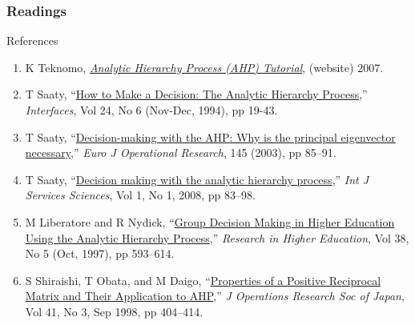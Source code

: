 \documentclass[10pt,handout,hyperref={colorlinks=true,linkcolor=blue,citecolor=citelink,urlcolor=gray}]{beamer}
\newcounter{e_temp}
\begin{document}
\begin{frame}[label=Readings]
\frametitle{Readings}
{\small
\vspace{-1.5ex}
\begin{block}{References}
\begin{enumerate}
\setlength{\itemsep}{1.75ex}
\item K Teknomo, \href{http://http://mathsci2.appstate.edu/~wmcb/Class/5340/ClassNotes141/AHP/AHP Tutorial Teknomo.pdf}{\it Analytic Hierarchy Process (AHP) Tutorial}, (website) 2007.

\item T Saaty, ``\href{http://mathsci2.appstate.edu/~wmcb/Class/5340/ClassNotes141/AHP/The\%20Analytic\%20Hierarchy\%20Process\%20Saaty\%201994.pdf}{How to Make a Decision: The Analytic Hierarchy Process},'' {\it Interfaces}, Vol 24, No 6 (Nov-Dec, 1994), pp 19-43.

\item T Saaty, ``\href{http://mathsci2.appstate.edu/~wmcb/Class/5340/ClassNotes141/AHP/Decision-making\%20with\%20the\%20AHP\%20Saaty\%202002.pdf}{Decision-making with the AHP: Why is the principal eigenvector necessary},''  {\it Euro J Operational Research}, 145 (2003), pp 85--91.

\item T Saaty, ``\href{http://mathsci2.appstate.edu/~wmcb/Class/5340/ClassNotes141/AHP/Analytic\%20Hierarchy\%20Proc\%20Saaty\%202008.pdf}{Decision making with the analytic hierarchy process},'' {\it Int J Services Sciences}, Vol 1, No 1, 2008, pp 83--98.

\item M Liberatore and R Nydick, ``\href{http://mathsci2.appstate.edu/~wmcb/Class/5340/ClassNotes141/AHP/Higher\%20Ed\%20AHP\%20Libertore\%20Nydick.pdf}{Group Decision Making in Higher Education Using the Analytic Hierarchy Process},'' {\it Research in Higher Education}, Vol 38, No 5 (Oct, 1997), pp 593--614.

\item S Shiraishi, T Obata, and M Daigo, ``\href{http://mathsci2.appstate.edu/~wmcb/Class/5340/ClassNotes141/AHP/Positive\%20Reciprocal\%20Matrix\%20Shiraishi\%2097.pdf}{Properties of a Positive Reciprocal Matrix and Their Application to AHP},'' {\it J Operations Research Soc of Japan}, Vol 41, No 3, Sep 1998, pp 404--414.
\end{enumerate}
\end{block}
\vfill
\centerline{\href{http://mathsci2.appstate.edu/~wmcb/Class/5340/ClassNotes141/AHP/Analytic\%20Hierarchy\%20Process\%20Print.pdf}{}}
}
\end{frame}


\end{document}
